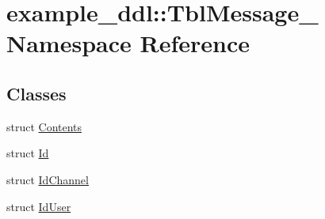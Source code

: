 \hypertarget{namespaceexample__ddl_1_1TblMessage__}{}\section{example\+\_\+ddl\+:\+:Tbl\+Message\+\_\+ Namespace Reference}
\label{namespaceexample__ddl_1_1TblMessage__}
\subsection*{Classes}
\begin{DoxyCompactItemize}
\item 
struct \hyperlink{structexample__ddl_1_1TblMessage___1_1Contents}{Contents}
\item 
struct \hyperlink{structexample__ddl_1_1TblMessage___1_1Id}{Id}
\item 
struct \hyperlink{structexample__ddl_1_1TblMessage___1_1IdChannel}{Id\+Channel}
\item 
struct \hyperlink{structexample__ddl_1_1TblMessage___1_1IdUser}{Id\+User}
\end{DoxyCompactItemize}
